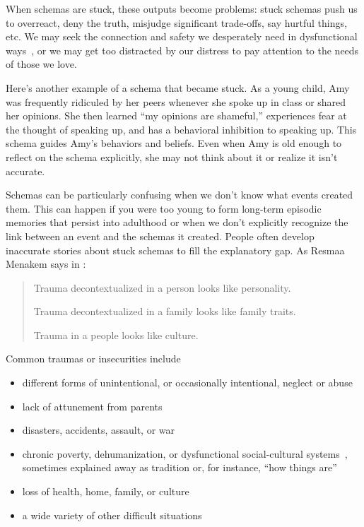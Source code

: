 \documentclass[11pt,oneside]{book}
\let\cite\parencite
\begin{document}
When schemas are stuck, these outputs become problems: stuck schemas push us to overreact, deny the truth, misjudge significant trade-offs, say hurtful things, etc. We may seek the connection and safety we desperately need in dysfunctional ways~\cite{brownAttachmentDisturbances}, or we may get too distracted by our distress to pay attention to the needs of those we love.

Here's another example of a schema that became stuck. As a young child, Amy was frequently ridiculed by her peers whenever she spoke up in class or shared her opinions. She then learned \enquote{my opinions are shameful,} experiences fear at the thought of speaking up, and has a behavioral inhibition to speaking up. This schema guides Amy's behaviors and beliefs. Even when Amy is old enough to reflect on the schema explicitly, she may not think about it or realize it isn't accurate.

Schemas can be particularly confusing when we don't know what events created them. This can happen if you were too young to form long-term episodic memories that persist into adulthood or when we don't explicitly recognize the link between an event and the schemas it created. People often develop inaccurate stories about stuck schemas to fill the explanatory gap. As Resmaa Menakem says in \textcite{menakemContext}:
\begin{quotation}
    Trauma decontextualized in a person looks like personality.
    
    Trauma decontextualized in a family looks like family traits.
    
    Trauma in a people looks like culture.
\end{quotation}

Common traumas or insecurities include
\begin{itemize}
    \item different forms of unintentional, or occasionally intentional, neglect or abuse
    \item lack of attunement from parents~\cite{brownAttachmentDisturbances}
    \item disasters, accidents, assault, or war
    \item chronic poverty, dehumanization, or dysfunctional social-cultural systems~\cite{roncaStructuralViolence}, sometimes explained away as tradition or, for instance, \enquote{how things are}
    \item loss of health, home, family, or culture
    \item a wide variety of other difficult situations
\end{itemize}
\end{document}
